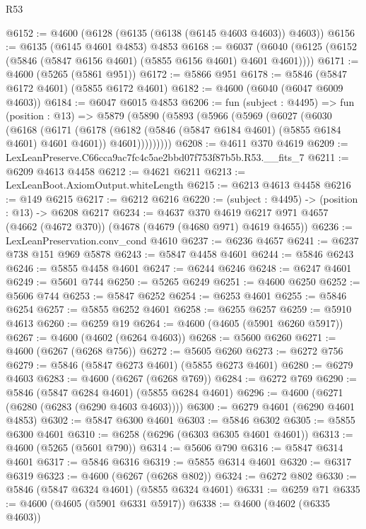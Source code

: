 \begin{lexlean}{R53}
\begin{coremodule}
@6152 := @4600 (@6128 (@6135 (@6138 (@6145 @4603 @4603)) @4603))
@6156 := @6135 (@6145 @4601 @4853) @4853
@6168 := @6037 (@6040 (@6125 (@6152 (@5846 (@5847 @6156 @4601) (@5855 @6156 @4601) @4601 @4601))))
@6171 := @4600 (@5265 (@5861 @951))
@6172 := @5866 @951
@6178 := @5846 (@5847 @6172 @4601) (@5855 @6172 @4601)
@6182 := @4600 (@6040 (@6047 @6009 @4603))
@6184 := @6047 @6015 @4853
@6206 := fun (subject : @4495) =>
  fun (position : @13) =>
  @5879
    (@5890
      (@5893
        (@5966
          (@5969
            (@6027
              (@6030
                (@6168
                  (@6171
                    (@6178
                      (@6182 (@5846 (@5847 @6184 @4601) (@5855 @6184 @4601) @4601 @4601))
                      @4601)))))))))
@6208 := @4611 @370 @4619
@6209 := LexLeanPreserve.C66cca9ac7fc4c5ae2bbd07f753f87b5b.R53.__fits_7
@6211 := @6209 @4613 @4458
@6212 := @4621 @6211
@6213 := LexLeanBoot.AxiomOutput.whiteLength
@6215 := @6213 @4613 @4458
@6216 := @149 @6215
@6217 := @6212 @6216
@6220 := (subject : @4495) -> (position : @13) -> @6208 @6217
@6234 := @4637
    @370
    @4619
    @6217
    @971
    @4657
    (@4662 (@4672 @370))
    (@4678 (@4679 (@4680 @971) @4619 @4655))
@6236 := LexLeanPreservation.conv_cond @4610
@6237 := @6236 @4657
@6241 := @6237 @738 @151 @969 @5878
@6243 := @5847 @4458 @4601
@6244 := @5846 @6243
@6246 := @5855 @4458 @4601
@6247 := @6244 @6246
@6248 := @6247 @4601
@6249 := @5601 @744
@6250 := @5265 @6249
@6251 := @4600 @6250
@6252 := @5606 @744
@6253 := @5847 @6252
@6254 := @6253 @4601
@6255 := @5846 @6254
@6257 := @5855 @6252 @4601
@6258 := @6255 @6257
@6259 := @5910 @4613
@6260 := @6259 @19
@6264 := @4600 (@4605 (@5901 @6260 @5917))
@6267 := @4600 (@4602 (@6264 @4603))
@6268 := @5600 @6260
@6271 := @4600 (@6267 (@6268 @756))
@6272 := @5605 @6260
@6273 := @6272 @756
@6279 := @5846 (@5847 @6273 @4601) (@5855 @6273 @4601)
@6280 := @6279 @4603
@6283 := @4600 (@6267 (@6268 @769))
@6284 := @6272 @769
@6290 := @5846 (@5847 @6284 @4601) (@5855 @6284 @4601)
@6296 := @4600 (@6271 (@6280 (@6283 (@6290 @4603 @4603))))
@6300 := @6279 @4601 (@6290 @4601 @4853)
@6302 := @5847 @6300 @4601
@6303 := @5846 @6302
@6305 := @5855 @6300 @4601
@6310 := @6258 (@6296 (@6303 @6305 @4601 @4601))
@6313 := @4600 (@5265 (@5601 @790))
@6314 := @5606 @790
@6316 := @5847 @6314 @4601
@6317 := @5846 @6316
@6319 := @5855 @6314 @4601
@6320 := @6317 @6319
@6323 := @4600 (@6267 (@6268 @802))
@6324 := @6272 @802
@6330 := @5846 (@5847 @6324 @4601) (@5855 @6324 @4601)
@6331 := @6259 @71
@6335 := @4600 (@4605 (@5901 @6331 @5917))
@6338 := @4600 (@4602 (@6335 @4603))

\end{coremodule}
\end{lexlean}
